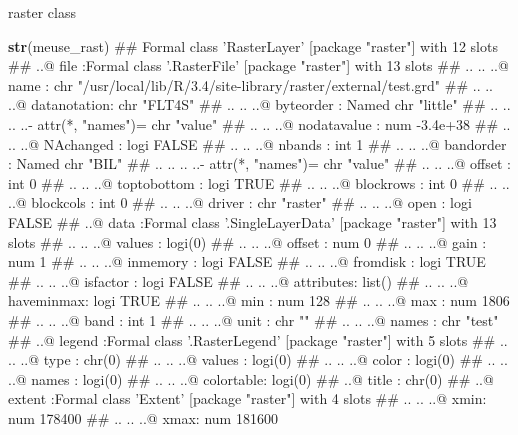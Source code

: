 \documentclass[11pt,ignorenonframetext,]{beamer}
\newenvironment{Shaded}{}{}
\newcommand{\KeywordTok}[1]{\textcolor[rgb]{0.00,0.44,0.13}{\textbf{#1}}}
\newcommand{\NormalTok}[1]{#1}
\let\oldShaded\Shaded
\let\endoldShaded\endShaded
\renewenvironment{Shaded}{\footnotesize\begin{spacing}{0.9}\oldShaded}{\endoldShaded\end{spacing}}
\let\oldverbatim\verbatim
\let\endoldverbatim\endverbatim
\newcommand{\scriptoutput}{
  \renewenvironment{Shaded}{\scriptsize\begin{spacing}{0.9}\oldShaded}{\endoldShaded\end{spacing}}
  \renewenvironment{verbatim}{\scriptsize\begin{spacing}{0.9}\oldverbatim}{\endoldverbatim\end{spacing}}
}
\begin{document}
\begin{frame}[fragile]{raster class}
\protect\hypertarget{raster-class}{}

\scriptoutput

\begin{Shaded}
\begin{Highlighting}[]
\KeywordTok{str}\NormalTok{(meuse_rast)}
\NormalTok{## Formal class 'RasterLayer' [package "raster"] with 12 slots}
\NormalTok{##   ..@ file    :Formal class '.RasterFile' [package "raster"] with 13 slots}
\NormalTok{##   .. .. ..@ name        : chr "/usr/local/lib/R/3.4/site-library/raster/external/test.grd"}
\NormalTok{##   .. .. ..@ datanotation: chr "FLT4S"}
\NormalTok{##   .. .. ..@ byteorder   : Named chr "little"}
\NormalTok{##   .. .. .. ..- attr(*, "names")= chr "value"}
\NormalTok{##   .. .. ..@ nodatavalue : num -3.4e+38}
\NormalTok{##   .. .. ..@ NAchanged   : logi FALSE}
\NormalTok{##   .. .. ..@ nbands      : int 1}
\NormalTok{##   .. .. ..@ bandorder   : Named chr "BIL"}
\NormalTok{##   .. .. .. ..- attr(*, "names")= chr "value"}
\NormalTok{##   .. .. ..@ offset      : int 0}
\NormalTok{##   .. .. ..@ toptobottom : logi TRUE}
\NormalTok{##   .. .. ..@ blockrows   : int 0}
\NormalTok{##   .. .. ..@ blockcols   : int 0}
\NormalTok{##   .. .. ..@ driver      : chr "raster"}
\NormalTok{##   .. .. ..@ open        : logi FALSE}
\NormalTok{##   ..@ data    :Formal class '.SingleLayerData' [package "raster"] with 13 slots}
\NormalTok{##   .. .. ..@ values    : logi(0) }
\NormalTok{##   .. .. ..@ offset    : num 0}
\NormalTok{##   .. .. ..@ gain      : num 1}
\NormalTok{##   .. .. ..@ inmemory  : logi FALSE}
\NormalTok{##   .. .. ..@ fromdisk  : logi TRUE}
\NormalTok{##   .. .. ..@ isfactor  : logi FALSE}
\NormalTok{##   .. .. ..@ attributes: list()}
\NormalTok{##   .. .. ..@ haveminmax: logi TRUE}
\NormalTok{##   .. .. ..@ min       : num 128}
\NormalTok{##   .. .. ..@ max       : num 1806}
\NormalTok{##   .. .. ..@ band      : int 1}
\NormalTok{##   .. .. ..@ unit      : chr ""}
\NormalTok{##   .. .. ..@ names     : chr "test"}
\NormalTok{##   ..@ legend  :Formal class '.RasterLegend' [package "raster"] with 5 slots}
\NormalTok{##   .. .. ..@ type      : chr(0) }
\NormalTok{##   .. .. ..@ values    : logi(0) }
\NormalTok{##   .. .. ..@ color     : logi(0) }
\NormalTok{##   .. .. ..@ names     : logi(0) }
\NormalTok{##   .. .. ..@ colortable: logi(0) }
\NormalTok{##   ..@ title   : chr(0) }
\NormalTok{##   ..@ extent  :Formal class 'Extent' [package "raster"] with 4 slots}
\NormalTok{##   .. .. ..@ xmin: num 178400}
\NormalTok{##   .. .. ..@ xmax: num 181600}

\end{Highlighting}
\end{Shaded}
\end{frame}
\end{document}
